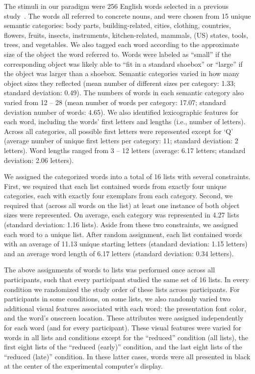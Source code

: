 \documentclass[11pt]{article}
\begin{document}
The stimuli in our paradigm were 256 English words selected in a previous
study~\citep{ZimaEtal18}. The words all referred to concrete nouns, and were
chosen from 15 unique semantic categories: body parts, building-related,
cities, clothing, countries, flowers, fruits, insects, instruments,
kitchen-related, mammals, (US) states, tools, trees, and vegetables. We also
tagged each word according to the approximate size of the object the word
referred to. Words were labeled as ``small'' if the corresponding object was
likely able to ``fit in a standard shoebox'' or ``large'' if the object was
larger than a shoebox. Semantic categories varied in how many object sizes they
reflected (mean number of different sizes per category: 1.33; standard
deviation: 0.49). The numbers of words in each semantic category also varied
from 12 -- 28 (mean number of words per category: 17.07; standard deviation
number of words: 4.65). We also identified lexicographic features for each
word, including the words' first letters and lengths (i.e., number of letters).
Across all categories, all possible first letters were represented except for
`Q' (average number of unique first letters per category: 11; standard
deviation: 2 letters). Word lengths ranged from 3 -- 12 letters (average: 6.17
letters; standard deviation: 2.06 letters).

We assigned the categorized words into a total of 16 lists with several
constraints. First, we required that each list contained words from exactly
four unique categories, each with exactly four exemplars from each category.
Second, we required that (across all words on the list) at least one instance
of both object sizes were represented. On average, each category was
represented in 4.27 lists (standard deviation: 1.16 lists). Aside from these
two constraints, we assigned each word to a unique list. After random
assignment, each list contained words with an average of 11.13 unique starting
letters (standard deviation: 1.15 letters) and an average word length of 6.17
letters (standard deviation: 0.34 letters).

The above assignments of words to lists was performed once across all
participants, such that every participant studied the same set of 16 lists. In
every condition we randomized the study order of these lists across
participants. For participants in some conditions, on some lists, we also
randomly varied two additional visual features associated with each word: the
presentation font color, and the word's onscreen location. These attributes
were assigned independently for each word (and for every participant). These
visual features were varied for words in all lists and conditions except for
the ``reduced'' condition (all lists), the first eight lists of the ``reduced
(early)'' condition, and the last eight lists of the ``reduced (late)''
condition. In these latter cases, words were all presented in black at the
center of the experimental computer's display.
\end{document}
